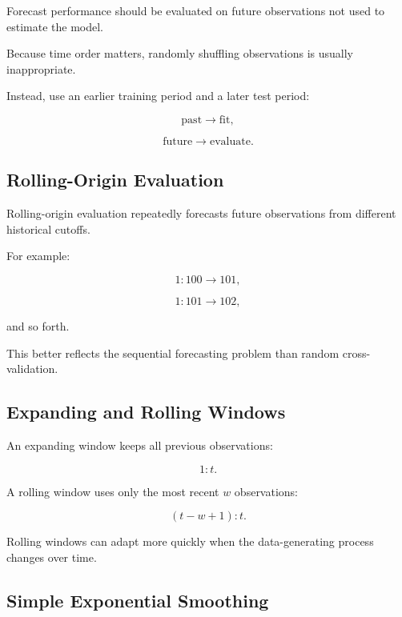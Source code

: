 Forecast performance should be evaluated on future observations not used
to estimate the model.

Because time order matters, randomly shuffling observations is usually
inappropriate.

Instead, use an earlier training period and a later test period:

\[
\boxed{
\text{past}
\rightarrow
\text{fit},
}
\]

\[
\boxed{
\text{future}
\rightarrow
\text{evaluate}.
}
\]

\subsection{Rolling-Origin Evaluation}
\label{subsec:rolling-origin-evaluation}

Rolling-origin evaluation repeatedly forecasts future observations from
different historical cutoffs.

For example:

\[
1{:}100
\rightarrow
101,
\]

\[
1{:}101
\rightarrow
102,
\]

and so forth.

This better reflects the sequential forecasting problem than random
cross-validation.

\subsection{Expanding and Rolling Windows}
\label{subsec:expanding-rolling-windows}

An expanding window keeps all previous observations:

\[
\boxed{
1{:}t.
}
\]

A rolling window uses only the most recent \(w\) observations:

\[
\boxed{
(t-w+1){:}t.
}
\]

Rolling windows can adapt more quickly when the data-generating process
changes over time.

\subsection{Simple Exponential Smoothing}
\label{subsec:simple-exponential-smoothing}

